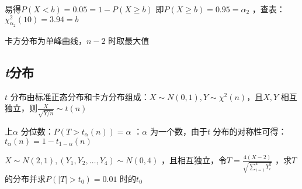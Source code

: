 易得$P\left( X<b \right)=0.05=1-P\left( X\ge b \right)$ 即$P\left( X\ge b \right)=0.95=\alpha_2$ ，查表：$\chi^2 _{\alpha_2}\left( 10 \right)=3.94=b$ 
\begin{notation}
卡方分布为单峰曲线，$n-2$ 时取最大值
\end{notation}
\subsection{\textit{t}分布}%
\label{sub:t分布}
\begin{defi}
    $t$ 分布由标准正态分布和卡方分布组成：$X\sim N\left( 0,1 \right),Y\sim \chi^2 \left( n \right)$，且$X,Y$ 相互独立，则$\frac{X}{\sqrt{Y /n}}\sim t\left( n \right)$
\end{defi}
\begin{notation}
    上$\alpha$ 分位数：$P\left( T>t_{\alpha}\left( n \right) \right)=\alpha$ ：$\alpha$ 为一个数，由于$t$ 分布的对称性可得：$t_{\alpha}\left( n \right)=1-t_{1-\alpha}\left( n \right)$
\end{notation}
\begin{eg}
    $X\sim N\left( 2,1 \right),\left( Y_1,Y_2,\ldots ,Y_4 \right)\sim N\left( 0,4 \right)$ ，且相互独立，令$T=\frac{4\left( X-2 \right)}{\sqrt{\sum_{i=1}^{4} Y_{i}^2 }}$ ，求$T$ 的分布并求$P\left( \left| T \right|>t_0 \right)=0.01$ 时的$t_0$
\end{eg}
